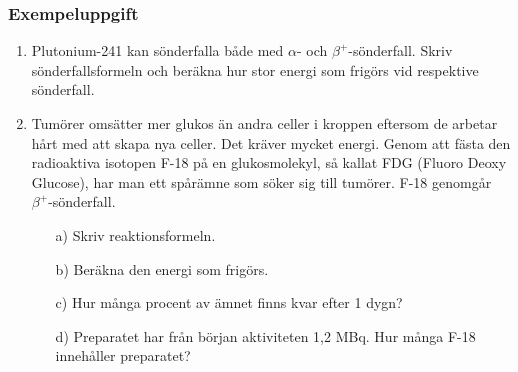 \documentclass[10pt, titlepage, oneside, a4paper]{article}
\newcommand{\Section}[1]{\section{#1}\vspace{-8pt}}
\newcommand{\Subsubsection}[1]{\vspace{-4pt}\subsubsection{#1}\vspace{-8pt}}
\begin{document}
    \Subsubsection{Exempeluppgift}
    \begin{enumerate}
    \item Plutonium-241 kan sönderfalla både med $\alpha$- och $\beta^+$-sönderfall. Skriv
    sönderfallsformeln och beräkna hur stor energi som frigörs vid respektive
    sönderfall.

    \item Tumörer omsätter mer glukos än andra celler i kroppen eftersom de arbetar
    hårt med att skapa nya celler. Det kräver mycket energi. Genom att fästa den
    radioaktiva isotopen F-18 på en glukosmolekyl, så kallat FDG (Fluoro Deoxy
    Glucose), har man ett spårämne som söker sig till tumörer. F-18 genomgår
    $\beta^+$-sönderfall.
    \begin{itemize}
        \item[a)] Skriv reaktionsformeln.
        \item[b)] Beräkna den energi som frigörs.
        \item[c)] Hur många procent av ämnet finns kvar efter 1 dygn?
        \item[d)] Preparatet har från början aktiviteten 1,2 MBq. Hur många F-18 innehåller preparatet?
    \end{itemize}












\end{enumerate}
\end{document}
